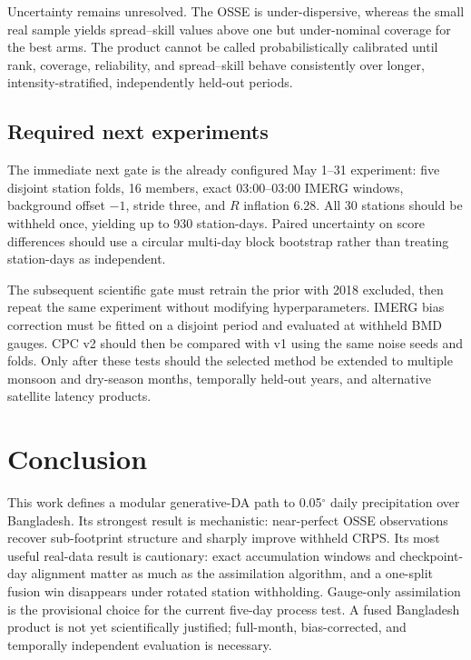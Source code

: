 \documentclass[10pt,twocolumn]{article}
\begin{document}
Uncertainty remains unresolved. The OSSE is under-dispersive, whereas the small real sample yields spread--skill values above one but under-nominal coverage for the best arms. The product cannot be called probabilistically calibrated until rank, coverage, reliability, and spread--skill behave consistently over longer, intensity-stratified, independently held-out periods.

\subsection{Required next experiments}

The immediate next gate is the already configured May 1--31 experiment: five disjoint station folds, 16 members, exact 03:00--03:00 IMERG windows, background offset $-1$, stride three, and $R$ inflation 6.28. All 30 stations should be withheld once, yielding up to 930 station-days. Paired uncertainty on score differences should use a circular multi-day block bootstrap rather than treating station-days as independent.

The subsequent scientific gate must retrain the prior with 2018 excluded, then repeat the same experiment without modifying hyperparameters. IMERG bias correction must be fitted on a disjoint period and evaluated at withheld BMD gauges. CPC v2 should then be compared with v1 using the same noise seeds and folds. Only after these tests should the selected method be extended to multiple monsoon and dry-season months, temporally held-out years, and alternative satellite latency products.

\section{Conclusion}

This work defines a modular generative-DA path to 0.05$^\circ$ daily precipitation over Bangladesh. Its strongest result is mechanistic: near-perfect OSSE observations recover sub-footprint structure and sharply improve withheld CRPS. Its most useful real-data result is cautionary: exact accumulation windows and checkpoint-day alignment matter as much as the assimilation algorithm, and a one-split fusion win disappears under rotated station withholding. Gauge-only assimilation is the provisional choice for the current five-day process test. A fused Bangladesh product is not yet scientifically justified; full-month, bias-corrected, and temporally independent evaluation is necessary.
\end{document}
